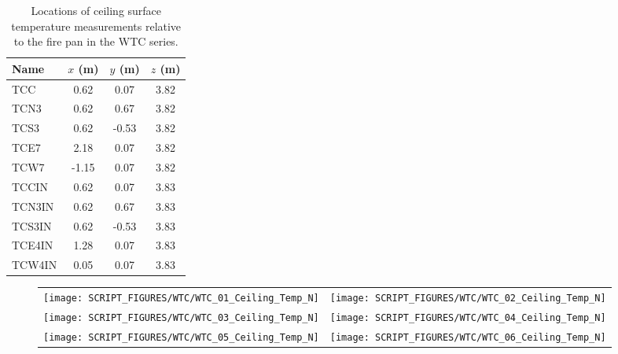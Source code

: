 \begin{table}[h!]
\caption[Ceiling surface measurement locations for the WTC series]{Locations of ceiling surface temperature measurements relative to the fire pan in the WTC series.}
\begin{center}
\begin{tabular}{|l|c|c|c|}
\hline
Name                & $x$ (m)   & $y$ (m)   & $z$ (m)   \\ \hline \hline
TCC                 & 0.62      & 0.07      & 3.82      \\ \hline
TCN3                & 0.62      & 0.67      & 3.82      \\ \hline
TCS3                & 0.62      & -0.53     & 3.82      \\ \hline
TCE7                & 2.18      & 0.07      & 3.82      \\ \hline
TCW7                & -1.15     & 0.07      & 3.82      \\ \hline \hline
TCCIN               & 0.62      & 0.07      & 3.83      \\ \hline
TCN3IN              & 0.62      & 0.67      & 3.83      \\ \hline
TCS3IN              & 0.62      & -0.53     & 3.83      \\ \hline
TCE4IN              & 1.28      & 0.07      & 3.83      \\ \hline
TCW4IN              & 0.05      & 0.07      & 3.83      \\ \hline
\end{tabular}
\end{center}
\label{WTC_Ceiling}
\end{table}

\newpage

\begin{figure}[p]
\begin{tabular*}{\textwidth}{l@{\extracolsep{\fill}}r}
\texttt{[image: SCRIPT\_FIGURES/WTC/WTC\_01\_Ceiling\_Temp\_N]} &
\texttt{[image: SCRIPT\_FIGURES/WTC/WTC\_02\_Ceiling\_Temp\_N]} \\
\texttt{[image: SCRIPT\_FIGURES/WTC/WTC\_03\_Ceiling\_Temp\_N]} &
\texttt{[image: SCRIPT\_FIGURES/WTC/WTC\_04\_Ceiling\_Temp\_N]} \\
\texttt{[image: SCRIPT\_FIGURES/WTC/WTC\_05\_Ceiling\_Temp\_N]} &
\texttt{[image: SCRIPT\_FIGURES/WTC/WTC\_06\_Ceiling\_Temp\_N]}
\end{tabular*}
\label{NIST_WTC_Ceiling_N}
\end{figure}

